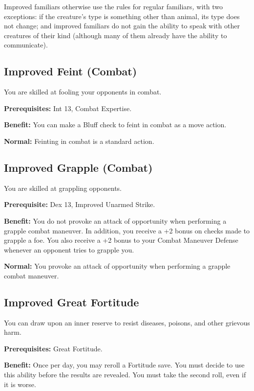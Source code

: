 				
Improved familiars otherwise use the rules for regular familiars\textit{, }with two exceptions: if the creature's type is something other than animal, its type does not change; and improved familiars do not gain the ability to speak with other creatures of their kind (although many of them already have the ability to communicate).
				
\subsection{Improved Feint (Combat)}

				
You are skilled at fooling your opponents in combat.
				
\textbf{Prerequisites:} Int 13, Combat Expertise.
				
\textbf{Benefit:} You can make a Bluff check to feint in combat as a move action.
				
\textbf{Normal:} Feinting in combat is a standard action.
				
\subsection{Improved Grapple (Combat)}

				
You are skilled at grappling opponents.
				
\textbf{Prerequisite:} Dex 13, Improved Unarmed Strike.
				
\textbf{Benefit:} You do not provoke an attack of opportunity when performing a grapple combat maneuver. In addition, you receive a +2 bonus on checks made to grapple a foe. You also receive a +2 bonus to your Combat Maneuver Defense whenever an opponent tries to grapple you.
				
\textbf{Normal:} You provoke an attack of opportunity when performing a grapple combat maneuver.
				
\subsection{Improved Great Fortitude}

				
You can draw upon an inner reserve to resist diseases, poisons, and other grievous harm.
				
\textbf{Prerequisites:} Great Fortitude.
				
\textbf{Benefit:} Once per day, you may reroll a Fortitude save. You must decide to use this ability before the results are revealed. You must take the second roll, even if it is worse.
				
